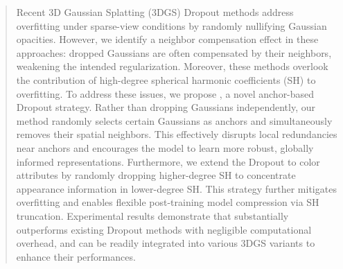 \begin{abstract}
Recent 3D Gaussian Splatting (3DGS) Dropout methods address overfitting under sparse-view conditions by randomly nullifying Gaussian opacities.
%
However, we identify a neighbor compensation effect in these approaches: dropped Gaussians are often compensated by their neighbors, weakening the intended regularization. Moreover, these methods overlook the contribution of high-degree spherical harmonic coefficients (SH) to overfitting.
%
To address these issues, we propose \methodname{}, a novel anchor-based Dropout strategy. Rather than dropping Gaussians independently, our method randomly selects certain Gaussians as anchors and simultaneously removes their spatial neighbors. This effectively disrupts local redundancies near anchors and encourages the model to learn more robust, globally informed representations.
%
Furthermore, we extend the Dropout to color attributes by randomly dropping higher-degree SH to concentrate appearance information in lower-degree SH. This strategy further mitigates overfitting and enables flexible post-training model compression via SH truncation.
%
Experimental results demonstrate that \methodname{} substantially outperforms existing Dropout methods with negligible computational overhead, and can be readily integrated into various 3DGS variants to enhance their performances.
\end{abstract}